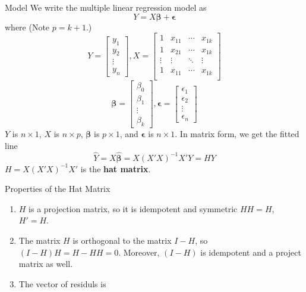 \documentclass{article}
\begin{document}
\begin{multicols*}{3}
    \begin{blackbox}{Model}
        We write the multiple linear regression model as 
        \[Y = X\boldsymbol{\beta} + \boldsymbol{\epsilon}\]
        where (Note $p = k+1$.) 
        \renewcommand{\arraystretch}{1.25}
        \[Y = \begin{bmatrix}
            y_1\\y_2\\\vdots\\y_n
        \end{bmatrix}, X = \begin{bmatrix}
            1 & x_{11} & \cdots & x_{1k}\\
            1 & x_{21} & \cdots & x_{1k}\\
            \vdots & \vdots & \ddots & \vdots\\
            1 & x_{11} & \cdots & x_{1k}\\
        \end{bmatrix} \]
        \[\boldsymbol{\beta} = \begin{bmatrix}
            \beta_0 \\\beta_1\\\vdots\\ \beta_k
        \end{bmatrix}, \boldsymbol{\epsilon} = \begin{bmatrix}
            \epsilon_1 \\ \epsilon_2 \\ \vdots \\ \epsilon_n
        \end{bmatrix}\]
        $Y$ is $n \times 1$, $X$ is $n\times p$, $\boldsymbol{\beta}$ is $p\times 1$, and $\boldsymbol{\epsilon}$ is $n \times 1$. 
        In matrix form, we get the fitted line 
        \[\hat{Y} = X\boldsymbol{\hat{\beta}} = X(X'X)^{-1}X'Y = HY\]
        $H =  X(X'X)^{-1}X'$ is the \textbf{hat matrix}.
        \begin{bluebox}{Properties of the Hat Matrix}
            \begin{enumerate}[label=(\alph*)]
                \item $H$ is a projection matrix, so it is idempotent and symmetric $HH = H$, $H' = H$.
                \item The matrix $H$ is orthogonal to the matrix $I - H$, so $(I - H)H = H - HH = 0$.
                Moreover, $(I-H)$ is idempotent and a project matrix as well.
                \item The vector of residuls is \\[-2ex]

\end{enumerate}
\end{bluebox}
\end{blackbox}
\end{multicols*}
\end{document}
